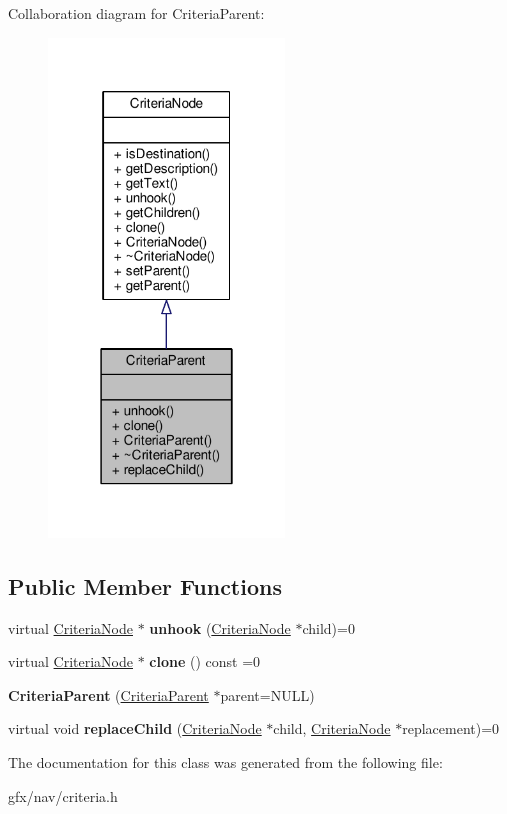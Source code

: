 Collaboration diagram for Criteria\+Parent\+:
\nopagebreak
\begin{figure}[H]
\begin{center}
\leavevmode
\includegraphics[width=178pt]{d5/da7/classCriteriaParent__coll__graph}
\end{center}
\end{figure}
\subsection*{Public Member Functions}
\begin{DoxyCompactItemize}
\item 
virtual \hyperlink{classCriteriaNode}{Criteria\+Node} $\ast$ {\bfseries unhook} (\hyperlink{classCriteriaNode}{Criteria\+Node} $\ast$child)=0\hypertarget{classCriteriaParent_ad925961506b4d67d700c785d8dd88d48}{}\label{classCriteriaParent_ad925961506b4d67d700c785d8dd88d48}

\item 
virtual \hyperlink{classCriteriaNode}{Criteria\+Node} $\ast$ {\bfseries clone} () const =0\hypertarget{classCriteriaParent_a010a5190a5b2f567099843294c0ca94b}{}\label{classCriteriaParent_a010a5190a5b2f567099843294c0ca94b}

\item 
{\bfseries Criteria\+Parent} (\hyperlink{classCriteriaParent}{Criteria\+Parent} $\ast$parent=N\+U\+LL)\hypertarget{classCriteriaParent_a5c42bbd8871d4aaa24e1159f8fbebbb0}{}\label{classCriteriaParent_a5c42bbd8871d4aaa24e1159f8fbebbb0}

\item 
virtual void {\bfseries replace\+Child} (\hyperlink{classCriteriaNode}{Criteria\+Node} $\ast$child, \hyperlink{classCriteriaNode}{Criteria\+Node} $\ast$replacement)=0\hypertarget{classCriteriaParent_a8f0d0cb157ba08aa56d2e84121c39251}{}\label{classCriteriaParent_a8f0d0cb157ba08aa56d2e84121c39251}

\end{DoxyCompactItemize}


The documentation for this class was generated from the following file\+:\begin{DoxyCompactItemize}
\item 
gfx/nav/criteria.\+h\end{DoxyCompactItemize}

